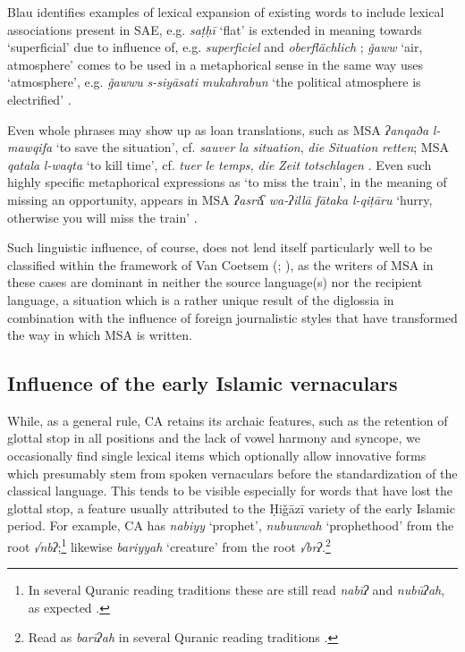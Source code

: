\documentclass[output=paper]{langsci/langscibook}
\begin{document}
Blau identifies examples of lexical expansion of existing words to include lexical associations present in SAE, e.g. \textit{saṭḥī} ‘flat’ is extended in meaning towards ‘superficial’ due to influence of, e.g.   \textit{superficiel} and  \textit{oberflächlich} \citep[65]{Blau1969}; \textit{ǧaww} ‘air, atmosphere’ comes to be used in a metaphorical sense in the same way  uses ‘atmosphere’, e.g. \textit{ǧawwu} \textit{s-siyāsati} \textit{mukahrabun} ‘the political atmosphere is electrified’ \citep[69]{Blau1969}.

Even whole phrases may show up as loan translations, such as MSA \textit{ʔanqaða} \textit{l-mawqifa} ‘to save the situation’, cf.  \textit{sauver} \textit{la} \textit{situation},  \textit{die} \textit{Situation} \textit{retten}; MSA \textit{qatala} \textit{l-waqta} ‘to kill time’, cf.  \textit{tuer} \textit{le} \textit{temps,}  \textit{die} \textit{Zeit} \textit{totschlagen} \citep[76]{Blau1969}. Even such highly specific metaphorical expressions as ‘to miss the train’, in the meaning of missing an opportunity, appears in MSA \textit{ʔasriʕ} \textit{wa-ʔillā} \textit{fātaka} \textit{l-qiṭāru} ‘hurry, otherwise you will miss the train’ \citep[101]{Blau1969}.

Such linguistic influence, of course, does not lend itself particularly well to be classified within the framework of Van Coetsem (\citeyear{VanCoetsem1988}; \citeyear{VanCoetsem2000}), as the writers of MSA in these cases are dominant in neither the {source language}(s) nor the {recipient language}, a situation which is a rather unique result of the  {diglossia} in combination with the influence of foreign journalistic styles that have transformed the way in which MSA is written.

\subsection{\label{bkm:Ref13224870}Influence of the early Islamic vernaculars}

While, as a general rule, CA retains its archaic features, such as the retention of glottal stop in all positions and the lack of vowel harmony and syncope, we occasionally find single lexical items which optionally allow innovative forms which presumably {stem} from spoken vernaculars before the standardization of the classical language. This tends to be visible especially for words that have lost the glottal stop, a feature usually attributed to the Ḥiǧāzī variety of the early Islamic period. For example, CA has \textit{nabiyy} ‘prophet’, \textit{nubuwwah} ‘prophethood’ from the {root} \textit{√nbʔ};\footnote{In several Quranic reading traditions these are still read \textit{nabīʔ} and \textit{nubūʔah}, as expected \citep[106--107]{IbnMujahid}.} likewise \textit{bariyyah} ‘creature’ from the {root} \textit{√brʔ}.\footnote{Read as \textit{barīʔah} in several Quranic reading traditions \citep[693]{IbnMujahid}.}
\end{document}
